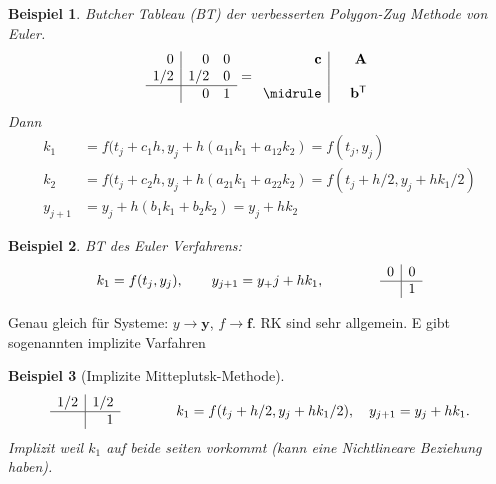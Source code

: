 \documentclass[a4paper]{article}
\newtheorem{bsp}{Beispiel}
\renewcommand{\vec}[1]{\mathbf{\bm{#1}}}
\newcommand{\mx}[1]{\mathbf{\bm{#1}}}
\begin{document}
\begin{bsp}
  Butcher Tableau (BT) der verbesserten Polygon-Zug Methode von Euler.
  \[
    \begin{array}{r|rr}
      0   & 0   & 0 \\
      1/2 & 1/2 & 0 \\
      \hline
          & 0   & 1
    \end{array}
    =
    \begin{array}{r|rr}
      \vec{c} && \mx{A} \\\\ \midrule
              && \vec{b}^\mathsf{T}
    \end{array}
  \]
  Dann
  \begin{align*}
    k_1 &= f(t_j + c_1 h, y_j + h(a_{11} k_1 + a_{12} k_2) = f(t_j, y_j) \\
    k_2 &= f(t_j + c_2 h, y_j + h(a_{21} k_1 + a_{22} k_2)
      = f(t_j + h/2, y_j + h k_1 / 2) \\
    y_{j+1} &= y_j + h(b_1 k_1 + b_2 k_2) = y_j + h k_2
  \end{align*}
\end{bsp}


\begin{bsp}
  BT des Euler Verfahrens:
  \[
    k_1 = f(t_j, y_j), \qquad
    y_{j+1} = y_+j + h k_1, \qquad \qquad
    \begin{array}{r|r}
      0 & 0 \\ \hline & 1
    \end{array}
  \]
\end{bsp}

Genau gleich für Systeme: $y \to \vec{y}$, $f \to \vec{f}$. RK sind sehr
allgemein. E gibt sogenannten implizite Varfahren

\begin{bsp}[Implizite Mitteplutsk-Methode]
  \[
    \begin{array}{r|r}
      1/2 & 1/2 \\ \hline & 1
    \end{array} \qquad\qquad
    k_1 = f(t_j + h/2, y_j + h k_1 / 2), \quad
    y_{j+1} = y_j + h k_1.
  \]
  Implizit weil $k_1$ auf beide seiten vorkommt (kann eine Nichtlineare
  Beziehung haben).
\end{bsp}
\end{document}

